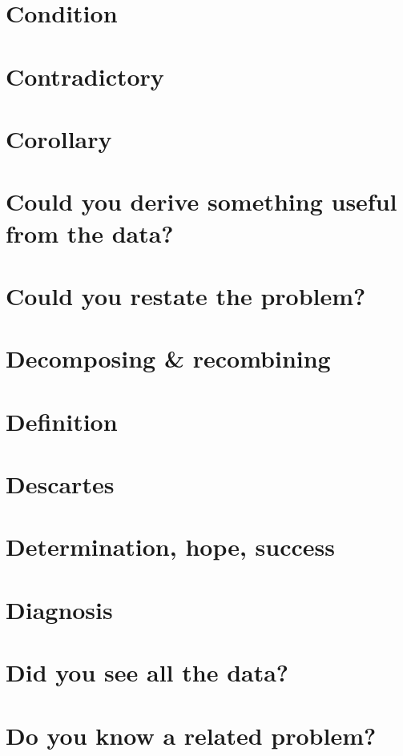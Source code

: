\documentclass[oneside]{book}
\numberwithin{equation}{section}
\begin{document}
\section*{Condition}

\section*{Contradictory}

\section*{Corollary}

\section*{Could you derive something useful from the data?}

\section*{Could you restate the problem?}

\section*{Decomposing \& recombining}

\section*{Definition}

\section*{Descartes}

\section*{Determination, hope, success}

\section*{Diagnosis}

\section*{Did you see all the data?}

\section*{Do you know a related problem?}
\end{document}
